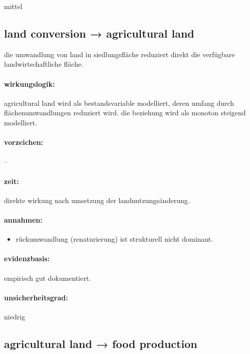 \documentclass[11pt, a4paper, oneside]{scrartcl}
\begin{document}
mittel


\subsection{land conversion → agricultural land}
die umwandlung von land in siedlungsfläche reduziert direkt die verfügbare landwirtschaftliche fläche. 

\paragraph{wirkungslogik:}
agricultural land wird als bestandsvariable modelliert, deren umfang durch flächenumwandlungen reduziert wird.
die beziehung wird als monoton steigend modelliert.

\paragraph{vorzeichen:}

--

\paragraph{zeit:} 

direkte wirkung nach umsetzung der landnutzungsänderung.

\paragraph{annahmen:}
\begin{itemize}
\item rückumwandlung (renaturierung) ist strukturell nicht dominant.
\end{itemize}

\paragraph{evidenzbasis:}

empirisch gut dokumentiert.

\paragraph{unsicherheitsgrad:} 

niedrig


\subsection{agricultural land → food production}
\end{document}
